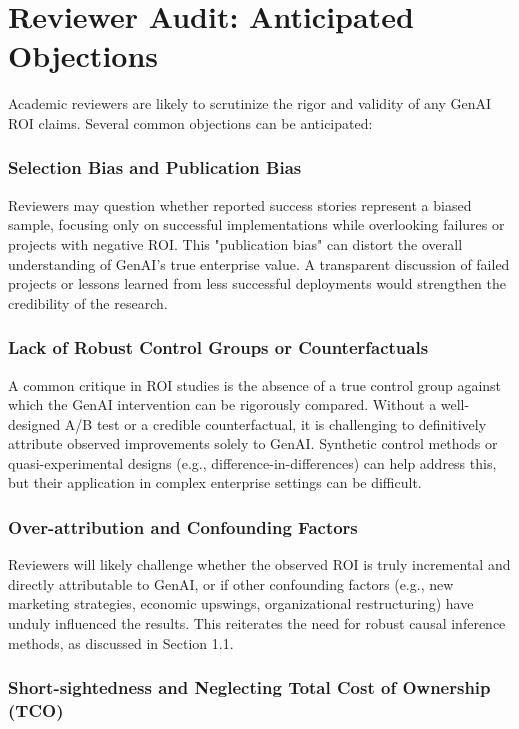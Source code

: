 \documentclass[10pt,journal,compsoc,twocolumn]{IEEEtran}
\begin{document}
\section{Reviewer Audit: Anticipated Objections}


Academic reviewers are likely to scrutinize the rigor and validity of any GenAI ROI claims. Several common objections can be anticipated:


\subsubsection{Selection Bias and Publication Bias}

Reviewers may question whether reported success stories represent a biased sample, focusing only on successful implementations while overlooking failures or projects with negative ROI. This "publication bias" can distort the overall understanding of GenAI's true enterprise value. A transparent discussion of failed projects or lessons learned from less successful deployments would strengthen the credibility of the research.


\subsubsection{Lack of Robust Control Groups or Counterfactuals}

A common critique in ROI studies is the absence of a true control group against which the GenAI intervention can be rigorously compared. Without a well-designed A/B test or a credible counterfactual, it is challenging to definitively attribute observed improvements solely to GenAI. Synthetic control methods or quasi-experimental designs (e.g., difference-in-differences) can help address this, but their application in complex enterprise settings can be difficult.


\subsubsection{Over-attribution and Confounding Factors}

Reviewers will likely challenge whether the observed ROI is truly incremental and directly attributable to GenAI, or if other confounding factors (e.g., new marketing strategies, economic upswings, organizational restructuring) have unduly influenced the results. This reiterates the need for robust causal inference methods, as discussed in Section 1.1.


\subsubsection{Short-sightedness and Neglecting Total Cost of Ownership (TCO)}
\end{document}
